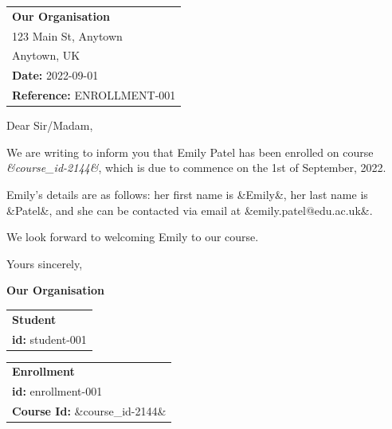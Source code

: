 \documentclass{article}
\begin{document}
\begin{tabular}{@{}l@{}}
\textbf{Our Organisation} \\
123 Main St, Anytown \\
Anytown, UK \\
\textbf{Date:} 2022-09-01 \\
\textbf{Reference:} ENROLLMENT-001
\end{tabular}

Dear Sir/Madam,

We are writing to inform you that Emily Patel has been enrolled on course \textit{\&course\_id-2144\&}, which is due to commence on the 1st of September, 2022.

Emily's details are as follows: her first name is \&Emily\&, her last name is \&Patel\&, and she can be contacted via email at \&emily.patel@edu.ac.uk\&.

We look forward to welcoming Emily to our course.

Yours sincerely,

\textbf{Our Organisation}

\begin{tabular}{@{}l@{}}
\textbf{Student} \\
\textbf{id:} student-001
\end{tabular}

\begin{tabular}{@{}l@{}}
\textbf{Enrollment} \\
\textbf{id:} enrollment-001 \\
\textbf{Course Id:} \&course\_id-2144\&
\end{tabular}
\end{document}
